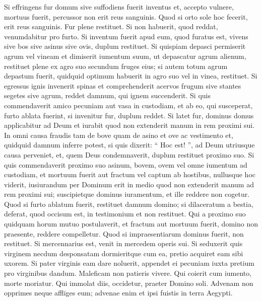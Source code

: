 \begin{biblechapter}
\begin{biblechapter}
\begin{biblechapter}
\begin{biblechapter}
\begin{biblechapter}
\begin{biblechapter}
\begin{biblechapter}
\begin{biblechapter}
\begin{biblechapter}
\begin{biblechapter}
\begin{biblechapter}
\begin{biblechapter}
\begin{biblechapter}
\begin{biblechapter}
\begin{biblechapter}
\begin{biblechapter}
\begin{biblechapter}
\begin{biblechapter}
\begin{biblechapter}
\begin{biblechapter}
\begin{biblechapter}
\begin{biblechapter}
\verse Si effringens fur domum sive suffodiens fuerit inventus et, accepto vulnere, mortuus fuerit, percussor non erit reus sanguinis. 
\verse Quod si orto sole hoc fecerit, erit reus sanguinis. Fur plene restituet. Si non habuerit, quod reddat, venumdabitur pro furto. 
\verse Si inventum fuerit apud eum, quod furatus est, vivens sive bos sive asinus sive ovis, duplum restituet.
 \verse Si quispiam depasci permiserit agrum vel vineam et dimiserit iumentum suum, ut depascatur agrum alienum, restituet plene ex agro suo secundum fruges eius; si autem totum agrum depastum fuerit, quidquid optimum habuerit in agro suo vel in vinea, restituet.
 \verse Si egressus ignis invenerit spinas et comprehenderit acervos frugum sive stantes segetes sive agrum, reddet damnum, qui ignem succenderit.
 \verse Si quis commendaverit amico pecuniam aut vasa in custodiam, et ab eo, qui susceperat, furto ablata fuerint, si invenitur fur, duplum reddet. 
\verse Si latet fur, dominus domus applicabitur ad Deum et iurabit quod non extenderit manum in rem proximi sui.
 \verse In omni causa fraudis tam de bove quam de asino et ove ac vestimento et, quidquid damnum inferre potest, si quis dixerit: “ Hoc est! ”, ad Deum utriusque causa perveniet, et, quem Deus condemnaverit, duplum restituet proximo suo.
 \verse Si quis commendaverit proximo suo asinum, bovem, ovem vel omne iumentum ad custodiam, et mortuum fuerit aut fractum vel captum ab hostibus, nullusque hoc viderit, 
\verse iusiurandum per Dominum erit in medio quod non extenderit manum ad rem proximi sui; suscipietque dominus iuramentum, et ille reddere non cogetur. 
\verse Quod si furto ablatum fuerit, restituet damnum domino; 
\verse si dilaceratum a bestia, deferat, quod occisum est, in testimonium et non restituet.
 \verse Qui a proximo suo quidquam horum mutuo postulaverit, et fractum aut mortuum fuerit, domino non praesente, reddere compelletur. 
\verse Quod si impraesentiarum dominus fuerit, non restituet. Si mercennarius est, venit in mercedem operis sui.
 \verse Si seduxerit quis virginem necdum desponsatam dormieritque cum ea, pretio acquiret eam sibi uxorem. 
\verse Si pater virginis eam dare noluerit, appendet ei pecuniam iuxta pretium pro virginibus dandum.
 \verse Maleficam non patieris vivere.
 \verse Qui coierit cum iumento, morte moriatur.
 \verse Qui immolat diis, occidetur, praeter Domino soli.
 \verse Advenam non opprimes neque affliges eum; advenae enim et ipsi fuistis in terra Aegypti.

\end{biblechapter}
\end{biblechapter}
\end{biblechapter}
\end{biblechapter}
\end{biblechapter}
\end{biblechapter}
\end{biblechapter}
\end{biblechapter}
\end{biblechapter}
\end{biblechapter}
\end{biblechapter}
\end{biblechapter}
\end{biblechapter}
\end{biblechapter}
\end{biblechapter}
\end{biblechapter}
\end{biblechapter}
\end{biblechapter}
\end{biblechapter}
\end{biblechapter}
\end{biblechapter}
\end{biblechapter}
